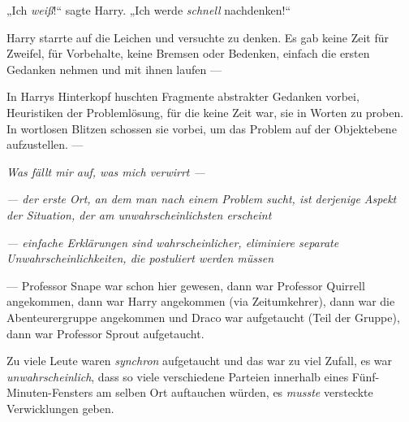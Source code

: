 „Ich \emph{weiß}!“ sagte Harry.
„Ich werde \emph{schnell} nachdenken!“

Harry starrte auf die Leichen und versuchte zu denken. Es gab keine Zeit für Zweifel, für Vorbehalte, keine Bremsen oder Bedenken, einfach die ersten Gedanken nehmen und mit ihnen laufen —

In Harrys Hinterkopf huschten Fragmente abstrakter Gedanken vorbei, Heuristiken der Problemlösung, für die keine Zeit war, sie in Worten zu proben. In wortlosen Blitzen schossen sie vorbei, um das Problem auf der Objektebene aufzustellen. —

\emph{Was fällt mir auf, was mich verwirrt —}

\emph{— der erste Ort, an dem man nach einem Problem sucht, ist derjenige Aspekt der Situation, der am unwahrscheinlichsten erscheint}

\emph{— einfache Erklärungen sind wahrscheinlicher, eliminiere separate Unwahrscheinlichkeiten, die postuliert werden müssen}

— Professor Snape war schon hier gewesen, dann war Professor Quirrell angekommen, dann war Harry angekommen (via Zeitumkehrer), dann war die Abenteurergruppe angekommen und Draco war aufgetaucht (Teil der Gruppe), dann war Professor Sprout aufgetaucht.

Zu viele Leute waren \emph{synchron} aufgetaucht und das war zu viel Zufall, es war \emph{unwahrscheinlich}, dass so viele verschiedene Parteien innerhalb eines Fünf-Minuten-Fensters am selben Ort auftauchen würden, es \emph{musste} versteckte Verwicklungen geben.

